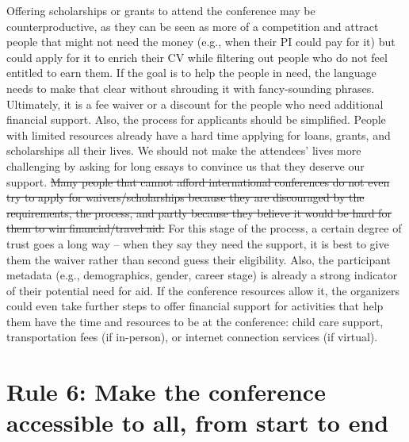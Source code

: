 \documentclass[10pt,letterpaper]{article}
\begin{document}
Offering scholarships or grants to attend the conference may be counterproductive, as they can be seen as more of a competition and attract people that might not need the money (e.g., when their PI could pay for it) but could apply for it to enrich their CV while filtering out people who do not feel entitled to earn them. If the goal is to help the people in need, the language needs to make that clear without shrouding it with fancy-sounding phrases. Ultimately, it is a fee waiver or a discount for the people who need additional financial support. Also, the process for applicants should be simplified. People with limited resources already have a hard time applying for loans, grants, and scholarships all their lives. We should not make the attendees' lives more challenging by asking for long essays to convince us that they deserve our support. \st{Many people that cannot afford international conferences do not even try to apply for waivers/scholarships because they are discouraged by the requirements, the process, and partly because they believe it would be hard for them to win financial/travel aid.} For this stage of the process, a certain degree of trust goes a long way -- when they say they need the support, it is best to give them the waiver rather than second guess their eligibility. Also, the participant metadata (e.g., demographics, gender, career stage) is already a strong indicator of their potential need for aid.
If the conference resources allow it, the organizers could even take further steps to offer financial support for activities that help them have the time and resources to be at the conference: child care support, transportation fees (if in-person), or internet connection services (if virtual). 

\section*{Rule 6: Make the conference accessible to all, from start to end}
\end{document}
